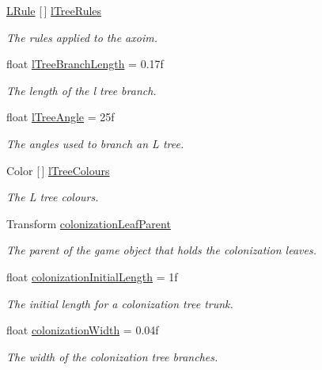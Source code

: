 \begin{DoxyCompactItemize}
\hyperlink{class_fractal_tree_1_1_l_rule}{L\+Rule} \mbox{[}$\,$\mbox{]} \hyperlink{class_fractal_tree_1_1_tree_builder_a725a1ff0ebe0fbbc78e22eedea80a50e}{l\+Tree\+Rules}
\begin{DoxyCompactList}\small\item\em The rules applied to the axoim. \end{DoxyCompactList}\item 
float \hyperlink{class_fractal_tree_1_1_tree_builder_a7416e2e2bea136c1406f79a98a8026ee}{l\+Tree\+Branch\+Length} = 0.\+17f
\begin{DoxyCompactList}\small\item\em The length of the l tree branch. \end{DoxyCompactList}\item 
float \hyperlink{class_fractal_tree_1_1_tree_builder_a10a0d2b7b57b98c4232ba414cdfa8436}{l\+Tree\+Angle} = 25f
\begin{DoxyCompactList}\small\item\em The angles used to branch an L tree. \end{DoxyCompactList}\item 
Color \mbox{[}$\,$\mbox{]} \hyperlink{class_fractal_tree_1_1_tree_builder_adf9df8010eaa8ed629b6e5210474b7eb}{l\+Tree\+Colours}
\begin{DoxyCompactList}\small\item\em The L tree colours. \end{DoxyCompactList}\item 
Transform \hyperlink{class_fractal_tree_1_1_tree_builder_a17c8e9ca6955ef3d2eadbf0fc54acfa3}{colonization\+Leaf\+Parent}
\begin{DoxyCompactList}\small\item\em The parent of the game object that holds the colonization leaves. \end{DoxyCompactList}\item 
float \hyperlink{class_fractal_tree_1_1_tree_builder_a1cd91a1a14415505680fa2deae9468ca}{colonization\+Initial\+Length} = 1f
\begin{DoxyCompactList}\small\item\em The initial length for a colonization tree trunk. \end{DoxyCompactList}\item 
float \hyperlink{class_fractal_tree_1_1_tree_builder_a22b8c477430d16faa020d724c8573a57}{colonization\+Width} = 0.\+04f
\begin{DoxyCompactList}\small\item\em The width of the colonization tree branches. \end{DoxyCompactList}\item 

\end{DoxyCompactItemize}
